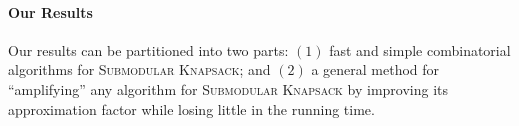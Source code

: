 \documentclass[a4paper,UKenglish,cleveref, autoref]{lipics-v2019}
\newcommand{\SK}{{\textsc{Submodular Knapsack}}\xspace}
\begin{document}
%
%

\paragraph*{Our Results}
Our results can be partitioned into two parts: $(1)$ fast and simple combinatorial algorithms for \SK; and $(2)$ a general method for ``amplifying'' any algorithm for \SK by improving its approximation factor while losing little in the running time.
\end{document}
